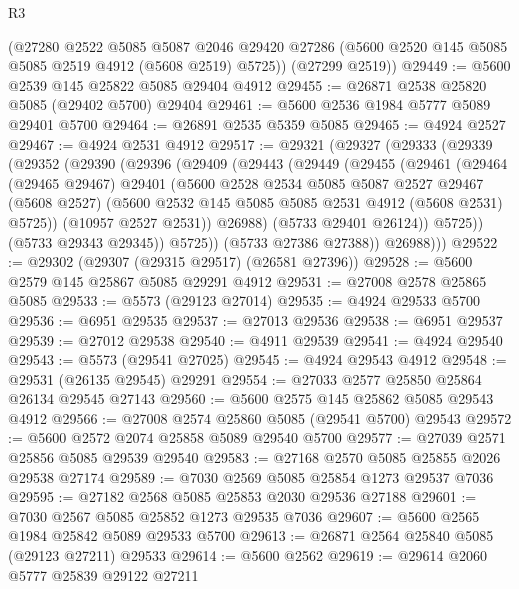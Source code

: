 \begin{lexlean}{R3}
\begin{coremodule}
      (@27280
        @2522
        @5085
        @5087
        @2046
        @29420
        @27286
        (@5600 @2520 @145 @5085 @5085 @2519 @4912 (@5608 @2519) @5725))
      (@27299 @2519))
@29449 := @5600 @2539 @145 @25822 @5085 @29404 @4912
@29455 := @26871 @2538 @25820 @5085 (@29402 @5700) @29404
@29461 := @5600 @2536 @1984 @5777 @5089 @29401 @5700
@29464 := @26891 @2535 @5359 @5085
@29465 := @4924 @2527
@29467 := @4924 @2531 @4912
@29517 := @29321
    (@29327
      (@29333
        (@29339
          (@29352
            (@29390
              (@29396
                (@29409
                  (@29443
                    (@29449
                      (@29455
                        (@29461
                          (@29464
                            (@29465 @29467)
                            @29401
                            (@5600
                              @2528
                              @2534
                              @5085
                              @5087
                              @2527
                              @29467
                              (@5608 @2527)
                              (@5600 @2532 @145 @5085 @5085 @2531 @4912 (@5608 @2531) @5725))
                            (@10957 @2527 @2531))
                          @26988)
                        (@5733 @29401 @26124))
                      @5725))
                  (@5733 @29343 @29345))
                @5725))
            (@5733 @27386 @27388))
          @26988)))
@29522 := @29302 (@29307 (@29315 @29517) (@26581 @27396))
@29528 := @5600 @2579 @145 @25867 @5085 @29291 @4912
@29531 := @27008 @2578 @25865 @5085
@29533 := @5573 (@29123 @27014)
@29535 := @4924 @29533 @5700
@29536 := @6951 @29535
@29537 := @27013 @29536
@29538 := @6951 @29537
@29539 := @27012 @29538
@29540 := @4911 @29539
@29541 := @4924 @29540
@29543 := @5573 (@29541 @27025)
@29545 := @4924 @29543 @4912
@29548 := @29531 (@26135 @29545) @29291
@29554 := @27033 @2577 @25850 @25864 @26134 @29545 @27143
@29560 := @5600 @2575 @145 @25862 @5085 @29543 @4912
@29566 := @27008 @2574 @25860 @5085 (@29541 @5700) @29543
@29572 := @5600 @2572 @2074 @25858 @5089 @29540 @5700
@29577 := @27039 @2571 @25856 @5085 @29539 @29540
@29583 := @27168 @2570 @5085 @25855 @2026 @29538 @27174
@29589 := @7030 @2569 @5085 @25854 @1273 @29537 @7036
@29595 := @27182 @2568 @5085 @25853 @2030 @29536 @27188
@29601 := @7030 @2567 @5085 @25852 @1273 @29535 @7036
@29607 := @5600 @2565 @1984 @25842 @5089 @29533 @5700
@29613 := @26871 @2564 @25840 @5085 (@29123 @27211) @29533
@29614 := @5600 @2562
@29619 := @29614 @2060 @5777 @25839 @29122 @27211

\end{coremodule}
\end{lexlean}
